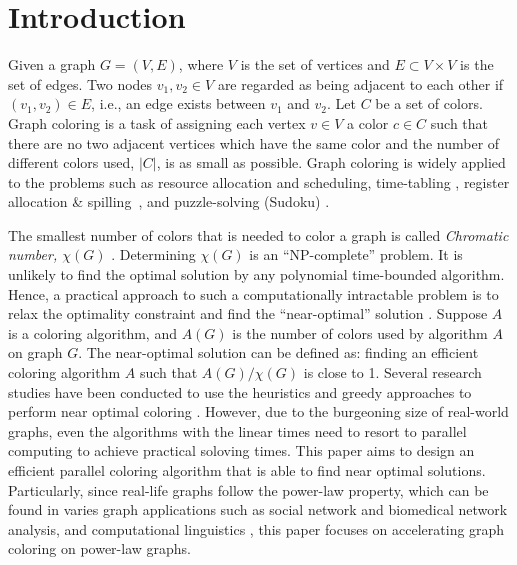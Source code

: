 \section{Introduction}
\label{intro}

Given a graph $G = (V, E)$, where $V$ is the set of vertices and $E \subset V \times V$ is the set of edges. Two nodes $v_1, v_2 \in V$ are regarded as being adjacent to each other if $(v_1, v_2) \in E$, i.e., an edge exists between $v_1$ and $v_2$. Let $C$ be a set of colors. Graph coloring is a task of assigning each vertex $v \in V$ a color $c \in C$ such that there are no two adjacent vertices which have the same color and the number of different colors used, $|C|$, is as small as possible. Graph coloring is widely applied to the problems such as resource allocation and scheduling, time-tabling \cite{marx2004graph}, register allocation \& spilling~\cite{chaitin1986register}, and puzzle-solving (Sudoku) \cite{sudoku}.

The smallest number of colors that is needed to color a graph is called \emph{Chromatic number, $\chi(G)$} \cite{west}. Determining $\chi(G)$ is an ``NP-complete'' problem. It is unlikely to find the optimal solution by any polynomial time-bounded algorithm. Hence, a practical approach to such a computationally intractable problem is to relax the optimality constraint and find the ``near-optimal'' solution \cite{Garey}. 
Suppose $A$ is a coloring algorithm, and $A(G)$ is the number of colors used by algorithm $A$ on graph $G$.  The near-optimal solution can be defined as: finding an efficient coloring algorithm $A$ such that $A(G)/\chi(G)$ is close to 1. Several research studies have been conducted to use the heuristics and greedy approaches to perform near optimal coloring \cite{greedy}. However, due to the burgeoning size of real-world graphs, even the algorithms with the linear times need to resort to parallel computing to achieve practical soloving times. This paper aims to design an efficient parallel coloring algorithm that is able to find near optimal solutions. Particularly, since real-life graphs follow the power-law property, which can be found in varies graph applications such as social network and biomedical network analysis, and computational linguistics \cite{linguistics}, this paper focuses on accelerating graph coloring on power-law graphs.

